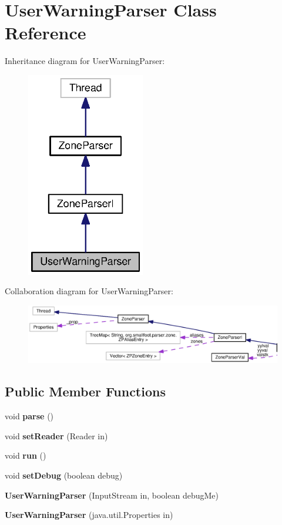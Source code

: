 \section{User\+Warning\+Parser Class Reference}
\label{classorg_1_1smallfoot_1_1parser_1_1zone_1_1UserWarningParser}


Inheritance diagram for User\+Warning\+Parser\+:\nopagebreak
\begin{figure}[H]
\begin{center}
\leavevmode
\includegraphics[width=146pt]{classorg_1_1smallfoot_1_1parser_1_1zone_1_1UserWarningParser__inherit__graph}
\end{center}
\end{figure}


Collaboration diagram for User\+Warning\+Parser\+:\nopagebreak
\begin{figure}[H]
\begin{center}
\leavevmode
\includegraphics[width=350pt]{classorg_1_1smallfoot_1_1parser_1_1zone_1_1UserWarningParser__coll__graph}
\end{center}
\end{figure}
\subsection*{Public Member Functions}
\begin{DoxyCompactItemize}
\item 
void {\bf parse} ()
\item 
void {\bf set\+Reader} (Reader in)
\item 
void {\bf run} ()
\item 
void {\bf set\+Debug} (boolean debug)
\item 
{\bf User\+Warning\+Parser} (Input\+Stream in, boolean debug\+Me)
\item 
{\bf User\+Warning\+Parser} (java.\+util.\+Properties in)
\end{DoxyCompactItemize}
